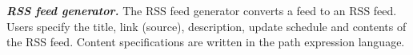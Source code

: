 \textbf{\textit{RSS feed generator.}} The RSS feed generator converts a
\padsd{} feed to an RSS feed. Users specify the title, link (source),
description, update schedule and contents of the RSS feed.  Content
specifications are written in the path expression language.




